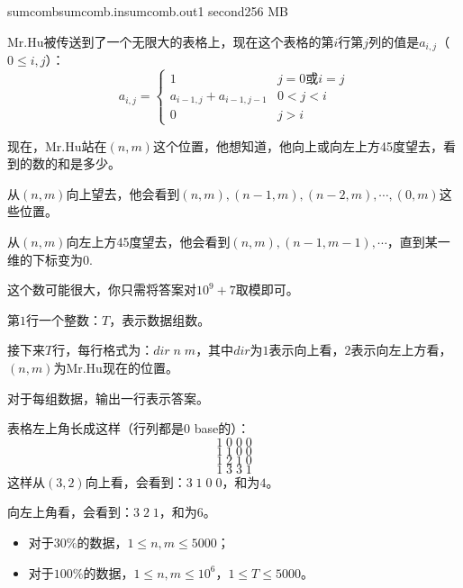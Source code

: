 \documentclass[11pt,a4paper,oneside]{article}
\begin{document}
\begin{problem}{sumcomb}{sumcomb.in}{sumcomb.out}{1 second}{256 MB}
	
	Mr.Hu被传送到了一个无限大的表格上，现在这个表格的第$i$行第$j$列的值是$a_{i,j}$（$0 \leq i, j$）：
	$$
		a_{i,j} = 
		\begin{cases}
			1 & j = 0 \text{或} i = j \\
			a_{i-1,j} + a_{i-1,j-1} & 0 < j < i \\
			0 & j > i
		\end{cases}
	$$
	
	现在，Mr.Hu站在$(n,m)$这个位置，他想知道，他向上或向左上方45度望去，看到的数的和是多少。
	
	从$(n,m)$向上望去，他会看到$(n,m),(n-1,m),(n-2,m),\cdots,(0,m)$这些位置。
	
	从$(n,m)$向左上方45度望去，他会看到$(n,m),(n-1,m-1),\cdots$，直到某一维的下标变为0.
	
	这个数可能很大，你只需将答案对$10^9 + 7$取模即可。
	
	\InputFile
	
	第$1$行一个整数：$T$，表示数据组数。
	
	接下来$T$行，每行格式为：$dir \; n \; m$，其中$dir$为$1$表示向上看，$2$表示向左上方看，$(n,m)$为Mr.Hu现在的位置。
	
	\OutputFile
	
	对于每组数据，输出一行表示答案。
	
	\Example
	
	\begin{example}
	\end{example}
	
	表格左上角长成这样（行列都是0 base的）：
	$$
		1 \; 0 \; 0 \; 0
	$$
	$$
		1 \; 1 \; 0 \; 0
	$$
	$$
		1 \; 2 \; 1 \; 0
	$$
	$$
		1 \; 3 \; 3 \; 1
	$$
	这样从$(3,2)$向上看，会看到：$3 \; 1 \; 0 \; 0$，和为$4$。
	
	向左上角看，会看到：$3 \; 2 \; 1$，和为$6$。
	
	\Note

	\begin{itemize}
		\item 对于$30\%$的数据，$1 \leq n, m \leq 5000$；
		\item 对于$100\%$的数据，$1 \leq n, m \leq 10^6$，$1 \leq T \leq 5000$。
	\end{itemize}

\end{problem}
\end{document}
